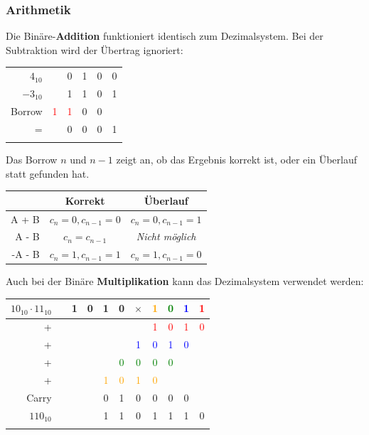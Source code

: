 \subsubsection{Arithmetik}
Die Binäre-\textbf{Addition} funktioniert identisch zum Dezimalsystem. Bei der Subtraktion wird der Übertrag ignoriert:
\begin{center}
	\begin{tabular}{r|ccccc}
		$4_{10}$ & & 0 & 1 & 0 & 0 \\
		$-3_{10}$ & & 1 & 1 & 0 & 1 \\
		\hline
		\tiny{Borrow} & \textcolor{red}{\tiny{1}} & \textcolor{red}{\tiny{1}} & \tiny{0} & \tiny{0} & \\
		\hline
		=     &  & 0 & 0 & 0 & 1 \\
		\hhline{======}
	\end{tabular}
\end{center}

\noindent Das Borrow $n$ und $n-1$ zeigt an, ob das Ergebnis korrekt ist, oder ein Überlauf statt gefunden hat.

\begin{center}
	\begin{tabular}{rc|c}
		& \textbf{Korrekt} & \textbf{Überlauf} \\
		\hline
		A + B & $c_n = 0,c_{n-1}=0$ & $c_n = 0,c_{n-1}=1$ \\
		A - B & $c_n = c_{n-1}$ & \textit{Nicht möglich }\\
		-A - B & $c_n = 1,c_{n-1}=1$ & $c_n = 1,c_{n-1}=0$ \\
	\end{tabular}
\end{center}

\noindent Auch bei der Binäre \textbf{Multiplikation} kann das Dezimalsystem verwendet werden:

\begin{center}
	\begin{tabular}{r|cccccccccc}
		$10_{10} \cdot 11_{10}$ & & 1 & 0 & 1 & 0 & $\times$ & \textcolor{orange}{1} & \textcolor{green}{0} & \textcolor{blue}{1} & \textcolor{red}{1} \\
		\hline
		                        + & &   &   &   &   &  & \textcolor{red}{1} & \textcolor{red}{0} & \textcolor{red}{1} & \textcolor{red}{0} \\
					            + & &   &   &   &   &  \textcolor{blue}{1} & \textcolor{blue}{0} & \textcolor{blue}{1} & \textcolor{blue}{0} & \\
     	                         + & &   &   &   &   \textcolor{green}{0} & \textcolor{green}{0} & \textcolor{green}{0} & \textcolor{green}{0} & & \\
					            + & &   &   &   \textcolor{orange}{1} & \textcolor{orange}{0} & \textcolor{orange}{1} & \textcolor{orange}{0} & & & \\
		\hline
		\tiny{Carry}            & &   &   &  \tiny{0} & \tiny{1} & \tiny{0} & \tiny{0} & \tiny{0} & \tiny{0} & \\
		\hline
		$110_{10}$                       & &   &   &  1 & 1 & 0 & 1 & 1 & 1 & 0 \\
		\hhline{===========}
	\end{tabular}
\end{center}
